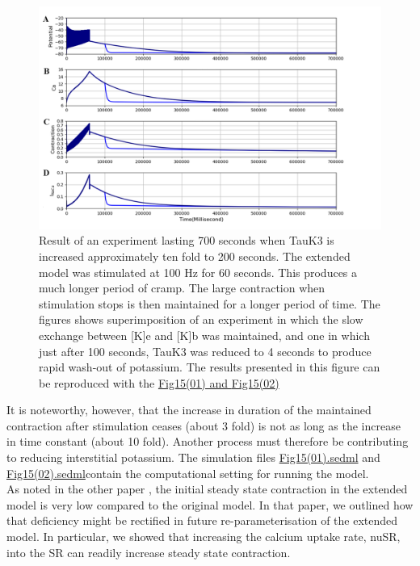 \documentclass[fleqn,10pt]{physiome}
\begin{document}
\begin{figure}[h!]
\centering
\includegraphics[width=0.9\linewidth]{figure14}
\caption{Result of an experiment lasting 700 seconds when TauK3 is increased approximately ten fold to 200 seconds. The extended model was stimulated at 100 Hz for 60 seconds. This produces a much longer period of cramp. The large contraction when stimulation stops is then maintained for a longer period of time. The figures shows superimposition of an experiment in which the slow exchange between [K]e and [K]b was maintained, and one in which just after 100 seconds, TauK3 was reduced to 4 seconds to produce rapid wash-out of potassium. The results presented in this figure can be reproduced with the \href{https://models.physiomeproject.org/workspace/5f4/file/26289d9227fbf4f66ca8106d8bf80ff9a51a5ac6/Fig15(01).sedml}{Fig15(01) and \href{https://models.physiomeproject.org/workspace/5f4/file/26289d9227fbf4f66ca8106d8bf80ff9a51a5ac6/Fig15(02).sedml}{Fig15(02)}}}
\label{fig14}
\end{figure}\newline

It is noteworthy, however, that the increase in duration of the maintained contraction after stimulation ceases (about 3 fold) is not as long as the increase in time constant (about 10 fold). Another process must therefore be contributing to reducing interstitial potassium. The simulation files \href{http://models.cellml.org/workspace/5f4/file/099d70c2ee6ed5dfb1ca33e0ce16db4f0247a4dc/Fig15(01).sedml}{Fig15(01).sedml} and \href{http://models.cellml.org/workspace/5f4/file/099d70c2ee6ed5dfb1ca33e0ce16db4f0247a4dc/Fig15(02).sedml}{Fig15(02).sedml}contain the computational setting for running the model.\\


As noted in the other paper \citep{Noble2019Incorporation}, the initial steady state contraction in the extended model is very low compared to the original model. In that paper, we outlined how that deficiency might be rectified in future re-parameterisation of the extended model. In particular, we showed that increasing the calcium uptake rate, nuSR, into the SR can readily increase steady state contraction.\newpage 
\end{document}
